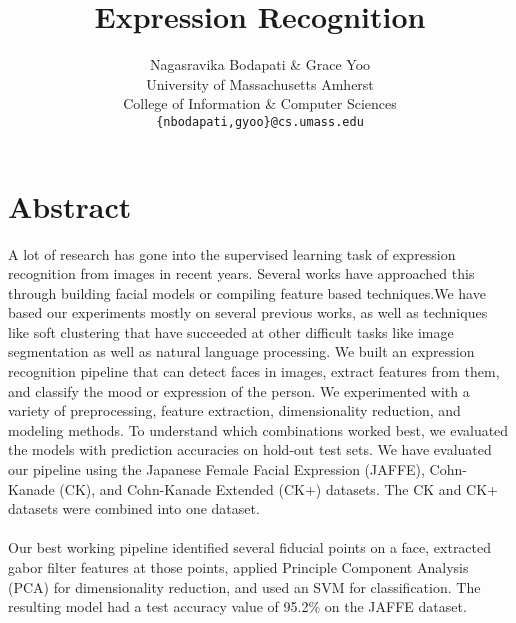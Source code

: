 \documentclass[10pt,twocolumn,letterpaper]{article}
\begin{document}
\title{Expression Recognition}

\author{Nagasravika Bodapati \& Grace Yoo \\ 
University of Massachusetts Amherst \\ 
College of Information \& Computer Sciences \\
{\tt\small \{nbodapati,gyoo\}@cs.umass.edu} \\
}

\maketitle

\section{Abstract} 
A lot of research has gone into the supervised learning task of expression recognition from images in recent years. Several works have approached this through building facial models or compiling feature based techniques.We have based our experiments mostly on several previous works, as well as techniques like soft clustering that have succeeded at other difficult tasks like image segmentation as well as natural language processing.
\noindent We built an expression recognition pipeline that can detect faces in images, extract features from them, and classify the mood or expression of the person. We experimented with a variety of preprocessing, feature extraction, dimensionality reduction, and modeling methods. To understand which combinations worked best, we evaluated the models with prediction accuracies on hold-out test sets. We have evaluated our pipeline using the Japanese Female Facial Expression (JAFFE), Cohn-Kanade (CK), and Cohn-Kanade Extended (CK+) datasets. The CK and CK+ datasets were combined into one dataset. 

\noindent \paragraph{} Our best working pipeline identified several fiducial points on a face, extracted gabor filter features at those points, applied Principle Component Analysis (PCA) for dimensionality reduction, and used an SVM for classification. The resulting model had a test accuracy value of 95.2\% on the JAFFE dataset.
\end{document}
